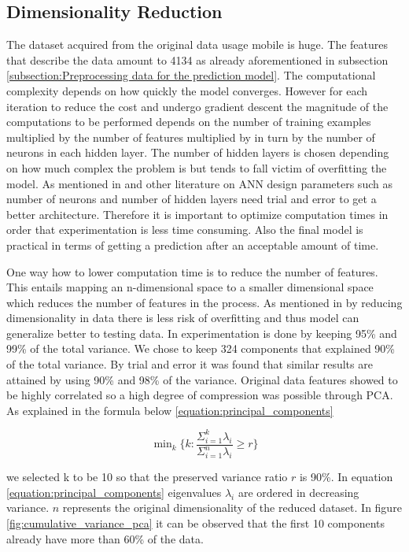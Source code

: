 \documentclass[12pt, a4paper]{report}
\theoremstyle{definition}
\theoremstyle{definition}%
\theoremstyle{definition}%
\theoremstyle{definition}%
\theoremstyle{definition}%
\theoremstyle{definition}%
\begin{document}
\subsection{Dimensionality Reduction}
The dataset acquired from the original data usage mobile is huge. The features that describe the data amount to 4134 as already aforementioned in subsection \ref{subsection:Preprocessing data for the prediction model}. The computational complexity depends on how quickly the model converges. However for each iteration to reduce the cost and undergo gradient descent the magnitude of the computations to be performed depends on the number of training examples multiplied by the number of features multiplied by in turn by the number of neurons in each hidden layer. The number of hidden layers is chosen depending on how much complex the problem is but tends to fall victim of overfitting the model. As mentioned in \cite{Jain1996} and other literature on ANN design parameters such as number of neurons and number of hidden layers need trial and error to get a better architecture. Therefore it is important to optimize computation times in order that experimentation is less time consuming. Also the final model is practical in terms of getting a prediction after an acceptable amount of time.

One way how to lower computation time is to reduce the number of features. This entails mapping an n-dimensional space to a smaller dimensional space which reduces the number of features in the process. As mentioned in \cite{Raschka} by reducing dimensionality in data there is less risk of overfitting and thus model can generalize better to testing data.  In \cite{Yang2004} experimentation is done by keeping 95\% and 99\% of the total variance. We chose to keep 324 components that explained 90\% of the total variance. By trial and error it was found that similar results are attained by using 90\% and 98\% of the variance. Original data features showed to be highly correlated so a high degree of compression was possible through PCA. As explained in the formula below \ref{equation:principal_components}


\begin{equation} \label{equation:principal_components}
 \mathop{\text{min}}_k \Bigg\{ k : \frac{{\Sigma }_{i=1}^{k} \lambda_i}{{\Sigma }_{i=1}^{n}\lambda_i} \geq r \Bigg\}
\end{equation}

we selected k to be 10 so that the preserved variance ratio $r$ is 90\%. In equation \ref{equation:principal_components} eigenvalues $\lambda_i$ are ordered in decreasing variance. $n$ represents the original dimensionality of the reduced dataset. In figure \ref{fig:cumulative_variance_pca} it can be observed that the first 10 components already have more than 60\% of the data.
\end{document}
